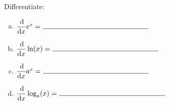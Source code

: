 \documentclass[12pt]{amsart}
\begin{document}
\begin{thm}[4 Points]
  Differentiate:
  \begin{enumerate}[(a)]
  \item
    \(\dfrac{\dif}{\dif x}e^x=\ \line(1,0){150}\)
    \vspace{.25in}
  \item
    \(\dfrac{\dif}{\dif x}\ln(x)=\ \line(1,0){150}\)
    \vspace{.25in}
  \item
    \(\dfrac{\dif}{\dif x}a^x=\ \line(1,0){150}\)
    \vspace{.25in}
  \item
    \(\dfrac{\dif}{\dif x}\log_a(x)=\ \line(1,0){150}\)  
  \end{enumerate}
\end{thm}
\end{document}
